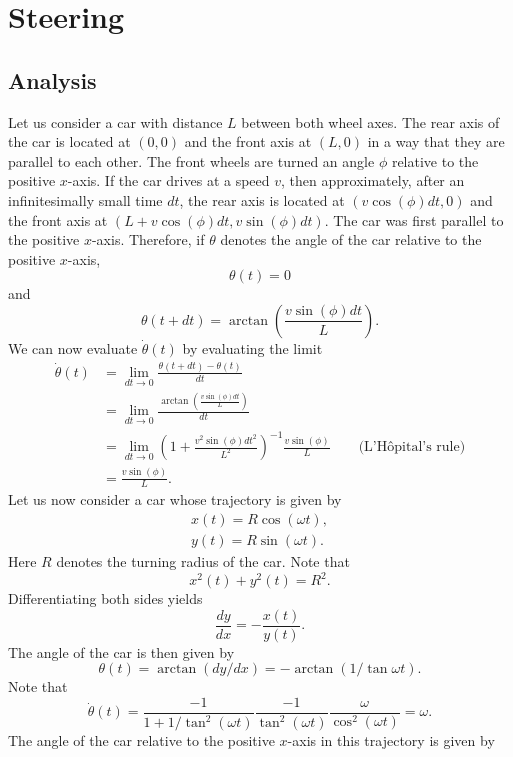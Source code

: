 \documentclass[11pt,titlepage]{report}
\begin{document}
\newcommand{\mat}[1]{\mathbf{#1}}

\chapter*{Steering}
\section*{Analysis}
Let us consider a car with distance $L$ between both wheel axes. The rear axis of the car is located at $(0,0)$ and the front axis at $(L,0)$ in a way that they are parallel to each other. The front wheels are turned an angle $\phi$ relative to the positive $x$-axis. If the car drives at a speed $v$, then approximately, after an infinitesimally small time $dt$, the rear axis is located at $(v \cos{(\phi)}dt,0)$ and the front axis at $(L+v \cos{(\phi)}dt,v \sin{(\phi)}dt)$. The car was first parallel to the positive $x$-axis. Therefore, if $\theta$ denotes the angle of the car relative to the positive $x$-axis,
\[
	\theta(t) = 0
\]
and
\[
	\theta(t+dt)=\arctan{\left(\frac{v \sin{(\phi)}dt}{L}\right)}.
\]
We can now evaluate $\dot{\theta}(t)$ by evaluating the limit
\begin{align}
	\dot{\theta}(t) &= \lim_{dt \rightarrow 0} \frac{\theta(t+dt)-\theta(t)}{dt} \nonumber \\
	&= \lim_{dt \rightarrow 0} \frac{\arctan{\left(\frac{v \sin{(\phi)}dt}{L}\right)}}{dt} \nonumber \\
	&= \lim_{dt \rightarrow 0} \left(1+\frac{v^2 \sin{(\phi)}dt^2}{L^2}\right)^{-1}\frac{v \sin{(\phi)}}{L} \quad \quad \text{(L'H\^opital's rule)} \nonumber \\
	&= \frac{v \sin{(\phi)}}{L}. \label{eq:steering-derivative}
\end{align}
Let us now consider a car whose trajectory is given by
\begin{align*}
	x(t) = R \cos{(\omega t)}, \\
	y(t) = R \sin{(\omega t)}.
\end{align*}
Here $R$ denotes the turning radius of the car. Note that
\[
	x^2(t)+y^2(t)=R^2.
\]
Differentiating both sides yields
\[
	\frac{dy}{dx}=-\frac{x(t)}{y(t)}.
\]
The angle of the car is then given by
\[
	\theta(t) = \arctan{(dy/dx)} = -\arctan{(1/\tan{\omega t})}.
\]
Note that
\[
	\dot{\theta}(t) = \frac{-1}{1+1/\tan^2{(\omega t)}} \frac{-1}{\tan^2{(\omega t)}} \frac{\omega}{\cos^2{(\omega t)}} = \omega.
\]
The angle of the car relative to the positive $x$-axis in this trajectory is given by
\end{document}
